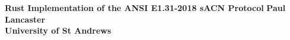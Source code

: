 \begin{titlepage}
	\begin{center}
		\vspace*{2cm}
		\textbf{Rust Implementation of the ANSI E1.31-2018 sACN Protocol}
		\vspace{1cm}
		\textbf{Paul Lancaster\\}
		\vspace{1cm}
		\textbf{University of St Andrews}
	\end{center}
\end{titlepage}